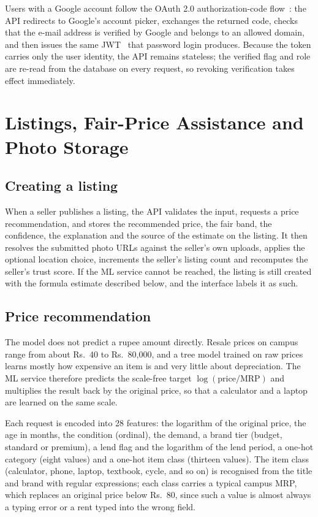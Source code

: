 \documentclass[11pt,letterpaper,oneside]{report}
\begin{document}
Users with a Google account follow the OAuth 2.0 authorization-code flow~\cite{oauth}: the API redirects
to Google's account picker, exchanges the returned code, checks that the e-mail address is verified
by Google and belongs to an allowed domain, and then issues the same JWT~\cite{jwt} that password login
produces. Because the token carries only the user identity, the API remains stateless; the verified
flag and role are re-read from the database on every request, so revoking verification takes effect
immediately.

\section{Listings, Fair-Price Assistance and Photo Storage}
\subsection{Creating a listing}
When a seller publishes a listing, the API validates the input, requests a price recommendation, and
stores the recommended price, the fair band, the confidence, the explanation and the source of the
estimate on the listing. It then resolves the submitted photo URLs against the seller's own uploads,
applies the optional location choice, increments the seller's listing count and recomputes the
seller's trust score. If the ML service cannot be reached, the listing is still created with the
formula estimate described below, and the interface labels it as such.

\subsection{Price recommendation}
The model does not predict a rupee amount directly. Resale prices on campus range from about Rs.~40
to Rs.~80{,}000, and a tree model trained on raw prices learns mostly how expensive an item is and
very little about depreciation. The ML service therefore predicts the scale-free target
$\log(\text{price}/\text{MRP})$ and multiplies the result back by the original price, so that a
calculator and a laptop are learned on the same scale.

Each request is encoded into 28 features: the logarithm of the original price, the age in months,
the condition (ordinal), the demand, a brand tier (budget, standard or premium), a lend flag and the
logarithm of the lend period, a one-hot category (eight values) and a one-hot item class (thirteen
values). The item class (calculator, phone, laptop, textbook, cycle, and so on) is recognised from the
title and brand with regular expressions; each class carries a typical campus MRP, which replaces an
original price below Rs.~80, since such a value is almost always a typing error or a rent typed into
the wrong field.
\end{document}
